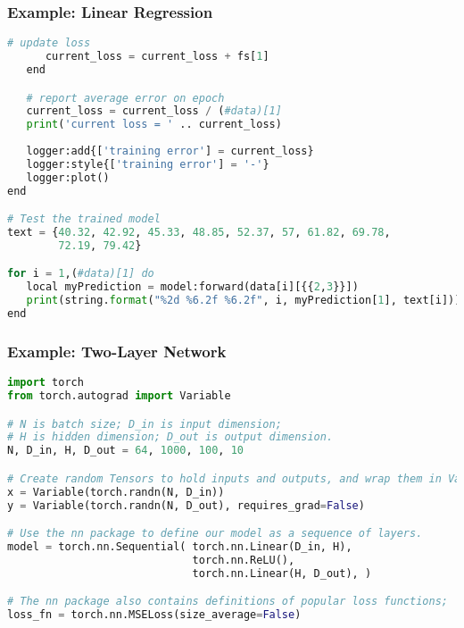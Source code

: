 \begin{frame}[fragile]
\MyLogo
\frametitle{Example: Linear Regression}  
\ContinueLineNumber
\scriptsize{
\begin{lstlisting}[language=python]
      # update loss       
      current_loss = current_loss + fs[1]
   end

   # report average error on epoch
   current_loss = current_loss / (#data)[1]
   print('current loss = ' .. current_loss)
   
   logger:add{['training error'] = current_loss}
   logger:style{['training error'] = '-'}
   logger:plot()  
end

# Test the trained model
text = {40.32, 42.92, 45.33, 48.85, 52.37, 57, 61.82, 69.78, 
        72.19, 79.42}

for i = 1,(#data)[1] do
   local myPrediction = model:forward(data[i][{{2,3}}])
   print(string.format("%2d %6.2f %6.2f", i, myPrediction[1], text[i]))
end
\end{lstlisting}
}
\end{frame}

\begin{frame}[fragile]
\MyLogo
\frametitle{Example: Two-Layer Network}  
\scriptsize{
\begin{lstlisting}[language=python]
import torch
from torch.autograd import Variable

# N is batch size; D_in is input dimension;
# H is hidden dimension; D_out is output dimension.
N, D_in, H, D_out = 64, 1000, 100, 10

# Create random Tensors to hold inputs and outputs, and wrap them in Variables.
x = Variable(torch.randn(N, D_in))
y = Variable(torch.randn(N, D_out), requires_grad=False)

# Use the nn package to define our model as a sequence of layers.
model = torch.nn.Sequential( torch.nn.Linear(D_in, H),
                             torch.nn.ReLU(),
                             torch.nn.Linear(H, D_out), )

# The nn package also contains definitions of popular loss functions;
loss_fn = torch.nn.MSELoss(size_average=False)
\end{lstlisting}
}
\end{frame}

